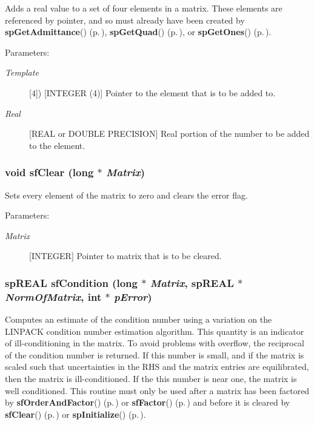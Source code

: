 Adds a real value to a set of four elements in a matrix. These elements are referenced by pointer, and so must already have been created by {\bf sp\-Get\-Admittance}() {\rm (p.\,\pageref{spBuild_8c_a13})}, {\bf sp\-Get\-Quad}() {\rm (p.\,\pageref{spBuild_8c_a14})}, or {\bf sp\-Get\-Ones}() {\rm (p.\,\pageref{spBuild_8c_a15})}.\begin{Desc}
\item[Parameters: ]\par
\begin{description}
\item[{\em 
Template}][4]) [INTEGER (4)] Pointer to the element that is to be added to. \item[{\em 
Real}][REAL or DOUBLE PRECISION] Real portion of the number to be added to the element. \end{description}
\end{Desc}
\subsubsection{\setlength{\rightskip}{0pt plus 5cm}void sf\-Clear (long $\ast$ {\em Matrix})}\label{spFortran_8c_a50}


Sets every element of the matrix to zero and clears the error flag.\begin{Desc}
\item[Parameters: ]\par
\begin{description}
\item[{\em 
Matrix}][INTEGER] Pointer to matrix that is to be cleared. \end{description}
\end{Desc}
\subsubsection{\setlength{\rightskip}{0pt plus 5cm}sp\-REAL sf\-Condition (long $\ast$ {\em Matrix}, sp\-REAL $\ast$ {\em Norm\-Of\-Matrix}, int $\ast$ {\em p\-Error})}\label{spFortran_8c_a85}


Computes an estimate of the condition number using a variation on the LINPACK condition number estimation algorithm. This quantity is an indicator of ill-conditioning in the matrix. To avoid problems with overflow, the reciprocal of the condition number is returned. If this number is small, and if the matrix is scaled such that uncertainties in the RHS and the matrix entries are equilibrated, then the matrix is ill-conditioned. If the this number is near one, the matrix is well conditioned. This routine must only be used after a matrix has been factored by {\bf sf\-Order\-And\-Factor}() {\rm (p.\,\pageref{spFortran_8c_a61})} or {\bf sf\-Factor}() {\rm (p.\,\pageref{spFortran_8c_a62})} and before it is cleared by {\bf sf\-Clear}() {\rm (p.\,\pageref{spFortran_8c_a50})} or {\bf sp\-Initialize}() {\rm (p.\,\pageref{spBuild_8c_a21})}.

